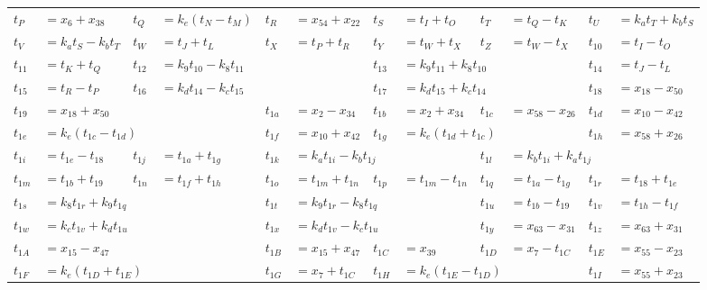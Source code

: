 \begin{tabular}{|p{4.3pt}l|p{4.3pt}l|p{4.3pt}l|p{4.3pt}l|p{4.3pt}l|p{4.3pt}l|}
$t_P $ &$= x_6 + x_{38}$ & $t_Q $ &$= k_e(t_N - t_M)$ & $t_R $ &$= x_{54} + x_{22}$ & $t_S $ &$= t_I + t_O$ & $t_T $ &$= t_Q - t_K$ & $t_U $ &$= k_at_T + k_bt_S$\\ 
$t_V $ &$= k_at_S - k_bt_T$ & $t_W $ &$= t_J + t_L$ & $t_X $ &$= t_P + t_R$ & $t_Y $ &$= t_W + t_X$ & $t_Z $ &$= t_W - t_X$ & $t_{10} $ &$= t_I - t_O$\\ 
$t_{11} $ &$= t_K + t_Q$ & $t_{12} $ &\multicolumn{3}{l|}{$= k_9t_{10} - k_8t_{11}$} & $t_{13} $ &\multicolumn{3}{l|}{$= k_9t_{11} + k_8t_{10}$} & $t_{14} $ &$= t_J - t_L$\\ 
$t_{15} $ &$= t_R - t_P$ & $t_{16} $ &\multicolumn{3}{l|}{$= k_dt_{14} - k_ct_{15}$} & $t_{17} $ &\multicolumn{3}{l|}{$= k_dt_{15} + k_ct_{14}$} & $t_{18} $ &$= x_{18} - x_{50}$\\ 
$t_{19} $ &\multicolumn{3}{l|}{$= x_{18} + x_{50}$} & $t_{1a} $ &$= x_2 - x_{34}$ & $t_{1b} $ &$= x_2 + x_{34}$ & $t_{1c} $ &$= x_{58} - x_{26}$ & $t_{1d} $ &$= x_{10} - x_{42}$\\ 
$t_{1e} $ &\multicolumn{3}{l|}{$= k_e(t_{1c} - t_{1d})$} & $t_{1f} $ &$= x_{10} + x_{42}$ & $t_{1g} $ &\multicolumn{3}{l|}{$= k_e(t_{1d} + t_{1c})$} & $t_{1h} $ &$= x_{58} + x_{26}$\\ 
$t_{1i} $ &$= t_{1e} - t_{18}$ & $t_{1j} $ &$= t_{1a} + t_{1g}$ & $t_{1k} $ &\multicolumn{3}{l|}{$= k_at_{1i} - k_bt_{1j}$} & $t_{1l} $ &\multicolumn{3}{l|}{$= k_bt_{1i} + k_at_{1j}$}\\ 
$t_{1m} $ &$= t_{1b} + t_{19}$ & $t_{1n} $ &$= t_{1f} + t_{1h}$ & $t_{1o} $ &$= t_{1m} + t_{1n}$ & $t_{1p} $ &$= t_{1m} - t_{1n}$ & $t_{1q} $ &$= t_{1a} - t_{1g}$ & $t_{1r} $ &$= t_{18} + t_{1e}$\\ 
$t_{1s} $ &\multicolumn{3}{l|}{$= k_8t_{1r} + k_9t_{1q}$} & $t_{1t} $ &\multicolumn{3}{l|}{$= k_9t_{1r} - k_8t_{1q}$} & $t_{1u} $ &$= t_{1b} - t_{19}$ & $t_{1v} $ &$= t_{1h} - t_{1f}$\\ 
$t_{1w} $ &\multicolumn{3}{l|}{$= k_ct_{1v} + k_dt_{1u}$} & $t_{1x} $ &\multicolumn{3}{l|}{$= k_dt_{1v} - k_ct_{1u}$} & $t_{1y} $ &$= x_{63} - x_{31}$ & $t_{1z} $ &$= x_{63} + x_{31}$\\ 
$t_{1A} $ &\multicolumn{3}{l|}{$= x_{15} - x_{47}$} & $t_{1B} $ &$= x_{15} + x_{47}$ & $t_{1C} $ &$= x_{39}$ & $t_{1D} $ &$= x_7 - t_{1C}$ & $t_{1E} $ &$= x_{55} - x_{23}$\\ 
$t_{1F} $ &\multicolumn{3}{l|}{$= k_e(t_{1D} + t_{1E})$} & $t_{1G} $ &$= x_7 + t_{1C}$ & $t_{1H} $ &\multicolumn{3}{l|}{$= k_e(t_{1E} - t_{1D})$} & $t_{1I} $ &$= x_{55} + x_{23}$\\ 

\end{tabular}
